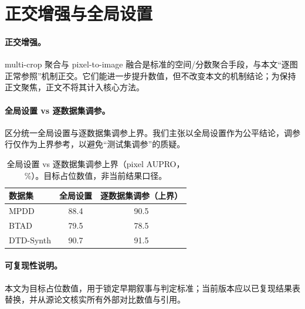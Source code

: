 \section{正交增强与全局设置}
\label{sec:appendix}

\paragraph{正交增强。}
multi-crop 聚合与 pixel-to-image 融合是标准的空间/分数聚合手段，与本文“逐图正常参照”机制正交。它们能进一步提升数值，但不改变本文的机制结论；为保持正文聚焦，正文不将其计入核心方法。

\paragraph{全局设置 vs 逐数据集调参。}
 区分统一全局设置与逐数据集调参上界。我们主张以全局设置作为公平结论，调参行仅作为上界参考，以避免“测试集调参”的质疑。

\begin{table}[h]
\centering
\caption{全局设置 vs 逐数据集调参上界（pixel AUPRO，\%）。目标占位数值，非当前结果口径。}
\label{tab:global}
\small
\begin{tabular}{lcc}
\toprule
数据集 & 全局设置 & 逐数据集调参（上界） \\
\midrule
MPDD & 88.4 & 90.5 \\
BTAD & 79.5 & 78.5 \\
DTD-Synth & 90.7 & 91.5 \\
\bottomrule
\end{tabular}
\end{table}

\paragraph{可复现性说明。}
本文为目标占位数值，用于锁定早期叙事与判定标准；当前版本应以已复现结果表替换，并从源论文核实所有外部对比数值与引用。
